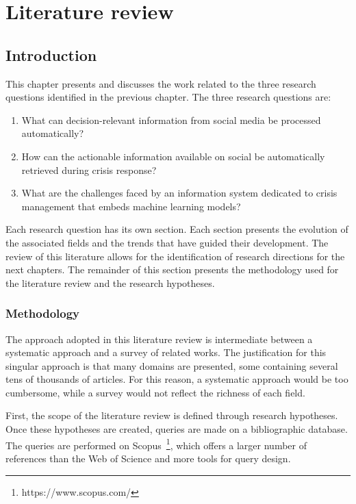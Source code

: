 \chapter{Literature review}

\section*{Introduction}
This chapter presents and discusses the work related to the three research questions identified in the previous chapter.
The three research questions are:

\begin{enumerate}
    \item What can decision-relevant information from social media be processed automatically?
    \item How can the actionable information available on social be automatically retrieved during crisis response?
    \item What are the challenges faced by an information system dedicated to crisis management that embeds machine learning models?
\end{enumerate}

Each research question has its own section.
Each section presents the evolution of the associated fields and the trends that have guided their development.
The review of this literature allows for the identification of research directions for the next chapters.
The remainder of this section presents the methodology used for the literature review and the research hypotheses.

\subsection*{Methodology}
The approach adopted in this literature review is intermediate between a systematic approach and a survey of related works.
The justification for this singular approach is that many domains are presented, some containing several tens of thousands of articles.
For this reason, a systematic approach would be too cumbersome, while a survey would not reflect the richness of each field.

First, the scope of the literature review is defined through research hypotheses.
Once these hypotheses are created, queries are made on a bibliographic database.
The queries are performed on Scopus~\footnote{https://www.scopus.com/}, which offers a larger number of references than the Web of Science and more tools for query design.

